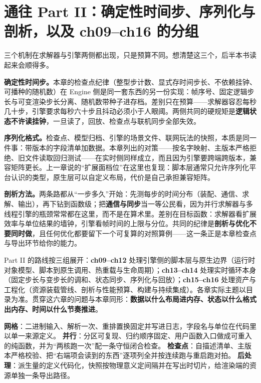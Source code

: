 \documentclass[12pt,a4paper,fontset=fandol]{ctexbook}
\newcommand{\Lang}[1]{\textsf{#1}}
\newcommand{\DomEngine}{\Lang{Engine}}
\begin{document}
\section{通往 Part II：确定性时间步、序列化与剖析，以及 ch09--ch16 的分组}
\label{sec:ch08-part2-bridge}

三个机制在求解器与引擎两侧都出现，只是预算不同。想清楚这三个，后半本书读起来会顺得多。

\textbf{确定性时间步。}本章的检查点纪律（整型步计数、显式存时间步长、不依赖挂钟、可播种的随机数）在 \DomEngine{} 侧是同一套东西的另一份实现：帧序号、固定逻辑步长与可变渲染步长分离、随机数带种子进存档。差别只在预算——求解器容忍每秒几十步，引擎要求每秒六十步且抖动必须小于人眼阈。两侧共同的硬规矩是\textbf{逻辑状态不许读挂钟}，一旦读了，回放、检查点与联机同步全部失效。

\textbf{序列化格式。}检查点、模型归档、引擎的场景文件、联网玩法的快照，本质是同一件事：带版本的字段清单加数据。本章列出的对策——按名字映射、主版本严格拒绝、旧文件读取回归测试——在实时侧同样成立，而且因为引擎要跨端跨版本，兼容矩阵更长。上一章说的``扩展面档位''在这里也复现：脚本层通常只允许序列化平台认识的类型，原生层可以自定义布局，代价是自己承担兼容矩阵。

\textbf{剖析方法。}两条路都从``一步多久''开始：先测每步的时间分布（装配、通信、求解、输出），再下钻到函数级；把\textbf{通信与同步}当一等公民看，因为并行求解器与多线程引擎的瓶颈常常都在这里，而不是在算术里。差别在目标函数：求解器看扩展效率与单位结果的墙钟，引擎看帧时间的上限与分位。共同的纪律是\textbf{剖析与优化不要同时做}，且任何优化都要留下一个可复算的对照算例——这一条正是本章检查点与导出环节给你的能力。

Part II 的路线按三组展开：\textbf{ch09--ch12} 处理引擎侧的脚本层与原生边界（运行时对象模型、脚本到原生调用、热重载与生命周期）；\textbf{ch13--ch14} 处理实时循环本身（固定步长与变步长的调和、状态同步、序列化与回放）；\textbf{ch15--ch16} 处理资产与工程化（资源装载管线、剖析与性能预算、构建与持续集成）。各章实际主题以目录为准。贯穿这六章的问题与本章同形：\textbf{数据以什么布局进内存、状态以什么格式出内存、时间以什么节奏推进}。

\begin{bestpractice}[title={Part I 收束：四个环节各自的最小可用配置}]
\textbf{网格}：二进制输入、解析一次、重排置换固定并写进日志，字段名与单位在代码里以单一来源定义。
\textbf{并行}：分区可复现、归约顺序固定、用户函数入口做成可重入的纯函数，并为``两核跑一次''配一条守恒闭合检查。
\textbf{检查点}：自描述清单、主版本严格校验、把``右端项会读到的东西''逐项列全并按连续跑与重启跑对拍。
\textbf{后处理}：派生量的定义代码化，快照按物理意义定间隔并在写出时切片，给渲染端的资源单独一条导出路径。
\end{bestpractice}
\end{document}
